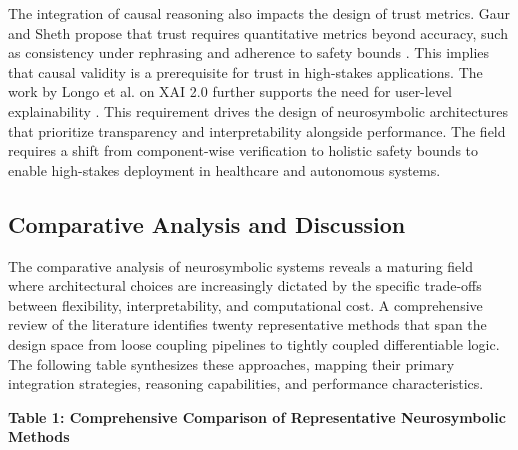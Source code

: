 \documentclass{article}
\begin{document}
The integration of causal reasoning also impacts the design of trust metrics. Gaur and Sheth propose that trust requires quantitative metrics beyond accuracy, such as consistency under rephrasing and adherence to safety bounds \cite{gaur2023building}. This implies that causal validity is a prerequisite for trust in high-stakes applications. The work by Longo et al. on XAI 2.0 further supports the need for user-level explainability \cite{longo2024explainable}. This requirement drives the design of neurosymbolic architectures that prioritize transparency and interpretability alongside performance. The field requires a shift from component-wise verification to holistic safety bounds to enable high-stakes deployment in healthcare and autonomous systems.

\subsection{Comparative Analysis and Discussion}

\label{sec:comparative_analysis_and_discussion}

The comparative analysis of neurosymbolic systems reveals a maturing field where architectural choices are increasingly dictated by the specific trade-offs between flexibility, interpretability, and computational cost. A comprehensive review of the literature identifies twenty representative methods that span the design space from loose coupling pipelines to tightly coupled differentiable logic. The following table synthesizes these approaches, mapping their primary integration strategies, reasoning capabilities, and performance characteristics.

\textbf{Table 1: Comprehensive Comparison of Representative Neurosymbolic Methods}
\end{document}
